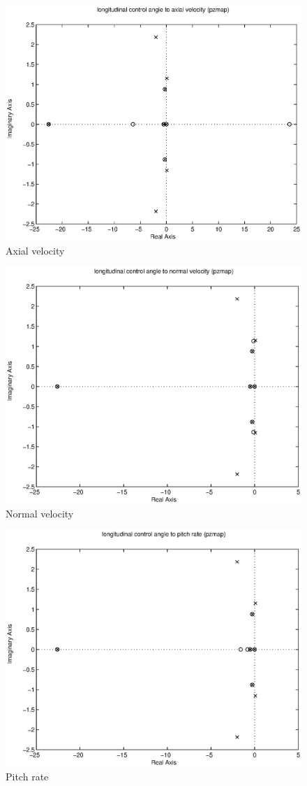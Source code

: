 \documentclass{sydeStyle}
\begin{document}
\begin{figure}[h]
    \centering
    \includegraphics[width=0.8\columnwidth]{figs/11pz}
    \caption{Axial velocity}
    \label{fig:long1}
\end{figure}

\begin{figure}[h]
    \centering
    \includegraphics[width=0.8\columnwidth]{figs/12pz}
    \caption{Normal velocity}
\end{figure}

\begin{figure}[h]
    \centering
    \includegraphics[width=0.8\columnwidth]{figs/13pz}
    \caption{Pitch rate}
\end{figure}
\end{document}
